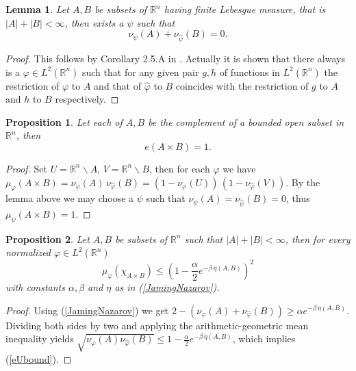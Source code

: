 \documentclass[12pt,a4paper]{article}
\newcommand{\RR}[1]{\mathbb{R}^#1}
\newtheorem{lemma}{Lemma}
\newtheorem{prop}{Proposition}
\begin{document}
\begin{lemma}
Let $A,B$ be subsets of $\RR n$ having finite Lebesgue measure, that is $|A|+|B|<\infty$, then exists a $\psi$ such that 
\begin{equation}
          \nu_{\psi}(A)+\nu_{\hat\psi}(B) = 0.
\end{equation}
\end{lemma}

\begin{proof}
This follows by Corollary 2.5.A in \cite{havin_uncertainty_2012}. Actually it is
shown that there always is a $\varphi\in L^2(\RR n)$ such that for any given pair
$g,h$ of functions in $L^2(\RR n)$ the restriction of $\varphi$ to $A$ and that
of $\hat\varphi$ to $B$ coincides with the restriction of $g$ to $A$ and
$h$ to $B$ respectively. 
\end{proof}

\begin{prop}
Let each of $A,B$ be the complement of a bounded open subset in $\RR n$, then 
\begin{displaymath}
       e(A\times B) = 1.
\end{displaymath}
\end{prop}

\begin{proof}
Set $U={\RR n}\backslash A,\, V={\RR n}\backslash B$, then for each $\varphi$ we 
have $\mu_{\varphi}(A\times B)=\nu_{\varphi}(A)\,
\nu_{\hat\varphi}(B)=(1-\nu_{\varphi}(U))\, (1-\nu_{\hat\varphi}(V))$. By 
the lemma above we may choose a $\psi$ such that 
$\nu_{\psi}(A)=\nu_{\hat\psi}(B) = 0$, thus $\mu_{\psi}(A\times B)=1$.
\end{proof}

\begin{prop}
Let $A,B$ be subsets of $\RR n$ such that $|A|+|B|<\infty$, then for every 
normalized $\varphi\in L^2(\RR n)$
\begin{equation}\label{eUbound}
   \mu_{\varphi}(\chi_{A\times B}) \leq 
      \left( 1-\frac{\alpha}{2} e^{-\beta\, \eta(A,B)} \right)^2
\end{equation}
with constants $\alpha,\beta$ and $\eta$ as in (\ref{JamingNazarov}). 
\end{prop}

\begin{proof}
Using (\ref{JamingNazarov})  we get 
$2-\left(\nu_{\varphi}(A)+\nu_{\hat\varphi}(B)\right)\geq \alpha 
  e^{-\beta\,\eta(A,B)}$. Dividing both sides by two and applying the
  arithmetic-geometric mean inequality yields 
  $ \sqrt{\nu_{\varphi}(A)\nu_{\hat\varphi}(B)}\leq 
     1-\frac{\alpha}{2} e^{-\beta\, \eta(A,B)}$, which implies (\ref{eUbound}).
\end{proof}
\end{document}
